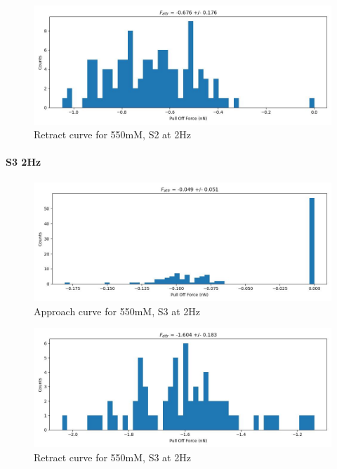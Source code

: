 \begin{figure}[h!]
\centering
\includegraphics[width=\textwidth]{chapter7/Tip speed/550mM/S2 2Hz/retract_f_a_hist.jpg}
\caption{Retract curve for 550mM, S2 at 2Hz}
\end{figure}

\paragraph{S3 2Hz}
\begin{figure}[h!]
\centering
\includegraphics[width=\textwidth]{chapter7/Tip speed/550mM/S3 2Hz/approach_f_a_hist.jpg}
\caption{Approach curve for 550mM, S3 at 2Hz}
\end{figure}

\begin{figure}[h!]
\centering
\includegraphics[width=\textwidth]{chapter7/Tip speed/550mM/S3 2Hz/retract_f_a_hist.jpg}
\caption{Retract curve for 550mM, S3 at 2Hz}
\end{figure}




